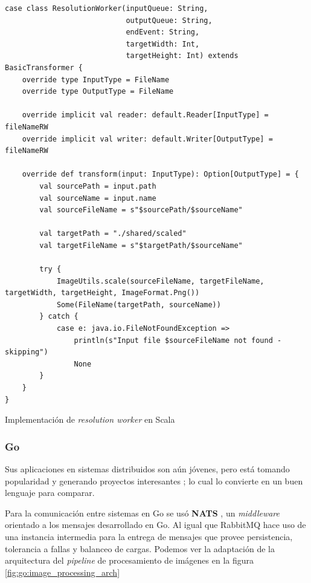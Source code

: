 \documentclass[11pt]{article}
\let\Oldsubsubsection\subsubsection
\renewcommand{\subsubsection}{\FloatBarrier\Oldsubsubsection}
\begin{document}
\begin{listing}[ht]
\begin{verbatim}
case class ResolutionWorker(inputQueue: String,
                            outputQueue: String,
                            endEvent: String,
                            targetWidth: Int,
                            targetHeight: Int) extends BasicTransformer {
    override type InputType = FileName
    override type OutputType = FileName

    override implicit val reader: default.Reader[InputType] = fileNameRW
    override implicit val writer: default.Writer[OutputType] = fileNameRW

    override def transform(input: InputType): Option[OutputType] = {
        val sourcePath = input.path
        val sourceName = input.name
        val sourceFileName = s"$sourcePath/$sourceName"

        val targetPath = "./shared/scaled"
        val targetFileName = s"$targetPath/$sourceName"

        try {
            ImageUtils.scale(sourceFileName, targetFileName, targetWidth, targetHeight, ImageFormat.Png())
            Some(FileName(targetPath, sourceName))
        } catch {
            case e: java.io.FileNotFoundException =>
                println(s"Input file $sourceFileName not found - skipping")
                None
        }
    }
}
\end{verbatim}
\caption{Implementación de \textit{resolution worker} en Scala}
\label{code:scala:resolution_worker}
\end{listing}

\subsubsection{Go}

Sus aplicaciones en sistemas distribuidos son aún jóvenes, pero está tomando popularidad y generando proyectos interesantes \cite{go:ex:awesome-go}; lo cual lo convierte en un buen lenguaje para comparar.

Para la comunicación entre sistemas en Go se usó \textbf{NATS} \cite{go:lib:nats}, un \textit{middleware} orientado a los mensajes desarrollado en Go. Al igual que RabbitMQ hace uso de una instancia intermedia para la entrega de mensajes que provee persistencia, tolerancia a fallas y balanceo de cargas. Podemos ver la adaptación de la arquitectura del \textit{pipeline} de procesamiento de imágenes en la figura \ref{fig:go:image_processing_arch}
\end{document}
